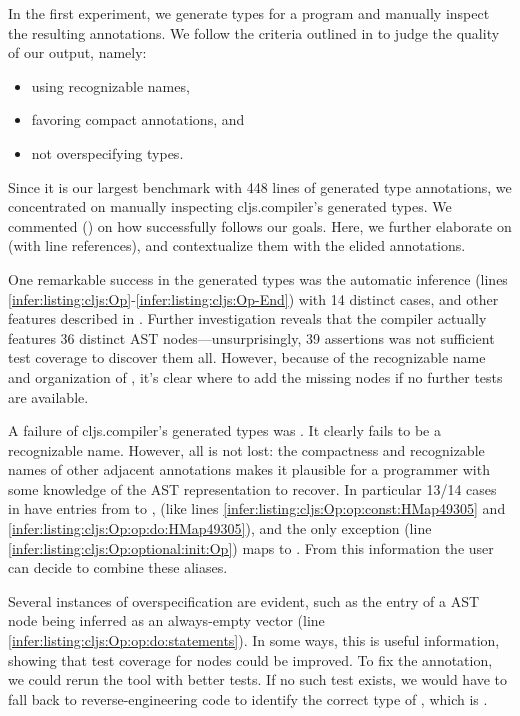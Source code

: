 \label{infer:sec:experiment1}

In the first experiment, we generate types for
a program and manually inspect the resulting
annotations.
We follow the criteria 
outlined in 
to judge the quality of our output, namely:
\begin{itemize}
  \item using recognizable names,
  \item favoring compact annotations, and
  \item not overspecifying types.
\end{itemize}

Since it is our largest benchmark with 448 lines
of generated type annotations,
we concentrated on manually inspecting cljs.compiler's
generated types.
We commented ()
on how successfully 
follows our goals.
Here, we further elaborate on 
(with line references), and contextualize them
with the elided annotations.

One remarkable success in the generated types
was the automatic inference  (lines \ref{infer:listing:cljs:Op}-\ref{infer:listing:cljs:Op-End})
with 14 distinct cases, and other features described in .
Further investigation reveals that
the compiler actually features 36 distinct AST nodes---unsurprisingly, 39 assertions was not sufficient
test coverage to discover them all.
However, because of the recognizable name and organization of
, it's clear where to add the missing nodes
if no further tests are available.

A failure of cljs.compiler's
generated types was .
It clearly fails to be a recognizable name.
However, all is not lost:
the compactness and recognizable names of other adjacent annotations
makes it plausible for a programmer with some
knowledge of the AST representation to 
recover.
In particular 13/14 cases in 
have entries from  to , 
(like lines \ref{infer:listing:cljs:Op:op:const:HMap49305} and \ref{infer:listing:cljs:Op:op:do:HMap49305}),
and the only exception (line \ref{infer:listing:cljs:Op:optional:init:Op})
maps to . From this information the user can
decide to combine these aliases.

Several instances of overspecification are evident,
such as the  entry of a  AST node being inferred as an always-empty vector
(line \ref{infer:listing:cljs:Op:op:do:statements}).
In some ways, this is useful information, showing that
test coverage for  nodes could be improved.
To fix the annotation, we could rerun the tool with better tests.
If no such test exists, we would have to fall back
to reverse-engineering code to identify the correct
type of , which is .

